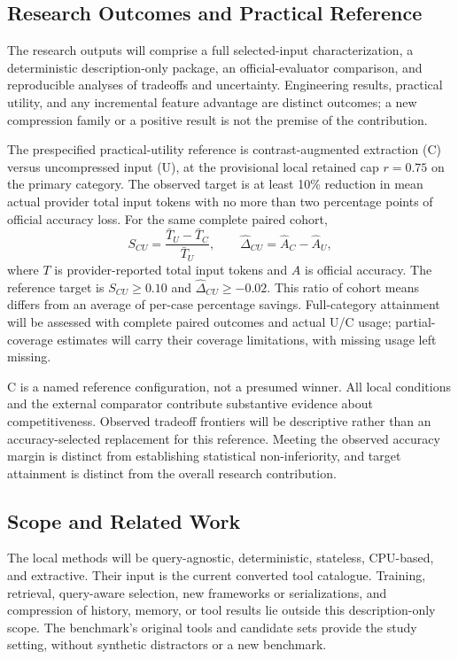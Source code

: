 \documentclass[conference]{IEEEtran}
\begin{document}
\subsection{Research Outcomes and Practical Reference}
The research outputs will comprise a full selected-input characterization, a deterministic description-only package, an official-evaluator comparison, and reproducible analyses of tradeoffs and uncertainty. Engineering results, practical utility, and any incremental feature advantage are distinct outcomes; a new compression family or a positive result is not the premise of the contribution.

The prespecified practical-utility reference is contrast-augmented extraction (C) versus uncompressed input (U), at the provisional local retained cap $r=0.75$ on the primary category. The observed target is at least 10\% reduction in mean actual provider total input tokens with no more than two percentage points of official accuracy loss. For the same complete paired cohort,
\begin{equation}
S_{CU}=\frac{\bar{T}_U-\bar{T}_C}{\bar{T}_U},
\qquad
\widehat{\Delta}_{CU}=\widehat{A}_C-\widehat{A}_U,
\end{equation}
where $T$ is provider-reported total input tokens and $A$ is official accuracy. The reference target is $S_{CU}\geq0.10$ and $\widehat{\Delta}_{CU}\geq-0.02$. This ratio of cohort means differs from an average of per-case percentage savings. Full-category attainment will be assessed with complete paired outcomes and actual U/C usage; partial-coverage estimates will carry their coverage limitations, with missing usage left missing.

C is a named reference configuration, not a presumed winner. All local conditions and the external comparator contribute substantive evidence about competitiveness. Observed tradeoff frontiers will be descriptive rather than an accuracy-selected replacement for this reference. Meeting the observed accuracy margin is distinct from establishing statistical non-inferiority, and target attainment is distinct from the overall research contribution.

\subsection{Scope and Related Work}
The local methods will be query-agnostic, deterministic, stateless, CPU-based, and extractive. Their input is the current converted tool catalogue. Training, retrieval, query-aware selection, new frameworks or serializations, and compression of history, memory, or tool results lie outside this description-only scope. The benchmark's original tools and candidate sets provide the study setting, without synthetic distractors or a new benchmark.
\end{document}
